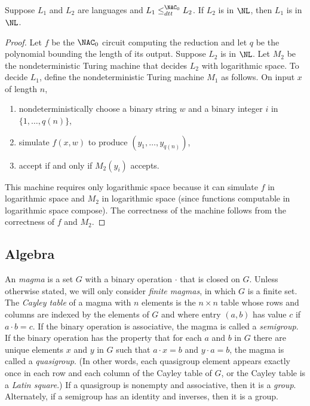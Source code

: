 \documentclass{article}
\begin{document}
\begin{lemma}\label{lem:dtt}
  Suppose $L_1$ and $L_2$ are languages and $L_1 \leq^{\NAC_0}_{dtt} L_2$.
  If $L_2$ is in $\NL$, then $L_1$ is in $\NL$.
\end{lemma}
\begin{proof}
  Let $f$ be the $\NAC_0$ circuit computing the reduction and let $q$ be the polynomial bounding the length of its output.
  Suppose $L_2$ is in $\NL$.
  Let $M_2$ be the nondeterministic Turing machine that decides $L_2$ with logarithmic space.
  To decide $L_1$, define the nondeterministic Turing machine $M_1$ as follows.
  On input $x$ of length $n$,
  \begin{enumerate}
  \item nondeterministically choose a binary string $w$ and a binary integer $i$ in $\{1, \dotsc, q(n)\}$,
  \item simulate $f(x, w)$ to produce $(y_1, \dotsc, y_{q(n)})$,
  \item accept if and only if $M_2(y_i)$ accepts.
  \end{enumerate}

  This machine requires only logarithmic space because it can simulate $f$ in logarithmic space and $M_2$ in logarithmic space (since functions computable in logarithmic space compose).
  The correctness of the machine follows from the correctness of $f$ and $M_2$.
\end{proof}

\subsection{Algebra}

An \emph{magma} is a set $G$ with a binary operation $\cdot$ that is closed on $G$.
Unless otherwise stated, we will only consider \emph{finite magmas}, in which $G$ is a finite set.
The \emph{Cayley table} of a magma with $n$ elements is the $n \times n$ table whose rows and columns are indexed by the elements of $G$ and where entry $(a, b)$ has value $c$ if $a \cdot b = c$.
If the binary operation is associative, the magma is called a \emph{semigroup}.
If the binary operation has the property that for each $a$ and $b$ in $G$ there are unique elements $x$ and $y$ in $G$ such that $a \cdot x = b$ and $y \cdot a = b$, the magma is called a \emph{quasigroup}.
(In other words, each quasigroup element appears exactly once in each row and each column of the Cayley table of $G$, or the Cayley table is a \emph{Latin square}.)
If a quasigroup is nonempty and associative, then it is a \emph{group}.
Alternately, if a semigroup has an identity and inverses, then it is a group.
\end{document}
